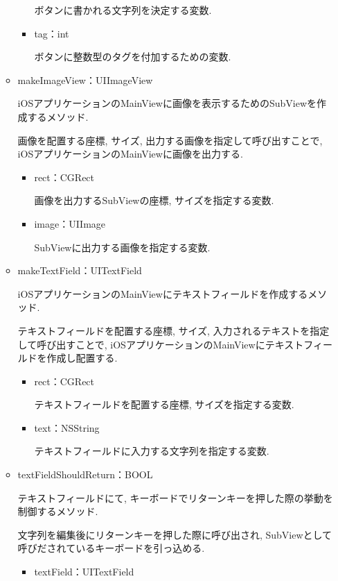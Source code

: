 \begin{itemize}
\begin{itemize}
\begin{itemize}
ボタンに書かれる文字列を決定する変数.

\item tag：int

ボタンに整数型のタグを付加するための変数.
\end{itemize}

\item makeImageView：UIImageView

iOSアプリケーションのMainViewに画像を表示するためのSubViewを作成するメソッド.

画像を配置する座標, サイズ, 出力する画像を指定して呼び出すことで, iOSアプリケーションのMainViewに画像を出力する.

\begin{itemize}
\item rect：CGRect

画像を出力するSubViewの座標, サイズを指定する変数.

\item image：UIImage

SubViewに出力する画像を指定する変数.
\end{itemize}

\item makeTextField：UITextField

iOSアプリケーションのMainViewにテキストフィールドを作成するメソッド.

テキストフィールドを配置する座標, サイズ, 入力されるテキストを指定して呼び出すことで, iOSアプリケーションのMainViewにテキストフィールドを作成し配置する.

\begin{itemize}
\item rect：CGRect

テキストフィールドを配置する座標, サイズを指定する変数.

\item text：NSString

テキストフィールドに入力する文字列を指定する変数.
\end{itemize}

\item textFieldShouldReturn：BOOL

テキストフィールドにて, キーボードでリターンキーを押した際の挙動を制御するメソッド.

文字列を編集後にリターンキーを押した際に呼び出され, SubViewとして呼びだされているキーボードを引っ込める.

\begin{itemize}
\item textField：UITextField


\end{itemize}
\end{itemize}
\end{itemize}
